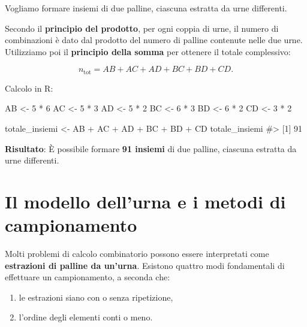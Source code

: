 \documentclass[
  italian,
  letterpaper,
  a4paper,
  11pt,
  open=any]{scrbook}
\newenvironment{Shaded}{\begin{snugshade}}{\end{snugshade}}
\newcommand{\CommentTok}[1]{\textcolor[rgb]{0.37,0.37,0.37}{#1}}
\newcommand{\DecValTok}[1]{\textcolor[rgb]{0.68,0.00,0.00}{#1}}
\newcommand{\NormalTok}[1]{\textcolor[rgb]{0.00,0.23,0.31}{#1}}
\newcommand{\OtherTok}[1]{\textcolor[rgb]{0.00,0.23,0.31}{#1}}
\newcommand{\SpecialCharTok}[1]{\textcolor[rgb]{0.37,0.37,0.37}{#1}}
\providecommand{\tightlist}{%
  \setlength{\itemsep}{0pt}\setlength{\parskip}{0pt}}
\theoremstyle{plain}
\theoremstyle{definition}
\theoremstyle{definition}
\theoremstyle{remark}
\begin{document}
Vogliamo formare insiemi di due palline, ciascuna estratta da urne
differenti.

Secondo il \textbf{principio del prodotto}, per ogni coppia di urne, il
numero di combinazioni è dato dal prodotto del numero di palline
contenute nelle due urne. Utilizziamo poi il \textbf{principio della
somma} per ottenere il totale complessivo:

\[
n_{\text{tot}} = AB + AC + AD + BC + BD + CD.
\]

Calcolo in R:

\begin{Shaded}
\begin{Highlighting}[]
\NormalTok{AB }\OtherTok{\textless{}{-}} \DecValTok{5} \SpecialCharTok{*} \DecValTok{6}
\NormalTok{AC }\OtherTok{\textless{}{-}} \DecValTok{5} \SpecialCharTok{*} \DecValTok{3}
\NormalTok{AD }\OtherTok{\textless{}{-}} \DecValTok{5} \SpecialCharTok{*} \DecValTok{2}
\NormalTok{BC }\OtherTok{\textless{}{-}} \DecValTok{6} \SpecialCharTok{*} \DecValTok{3}
\NormalTok{BD }\OtherTok{\textless{}{-}} \DecValTok{6} \SpecialCharTok{*} \DecValTok{2}
\NormalTok{CD }\OtherTok{\textless{}{-}} \DecValTok{3} \SpecialCharTok{*} \DecValTok{2}

\NormalTok{totale\_insiemi }\OtherTok{\textless{}{-}}\NormalTok{ AB }\SpecialCharTok{+}\NormalTok{ AC }\SpecialCharTok{+}\NormalTok{ AD }\SpecialCharTok{+}\NormalTok{ BC }\SpecialCharTok{+}\NormalTok{ BD }\SpecialCharTok{+}\NormalTok{ CD}
\NormalTok{totale\_insiemi}
\CommentTok{\#\textgreater{} [1] 91}
\end{Highlighting}
\end{Shaded}

\textbf{Risultato}: È possibile formare \textbf{91 insiemi} di due
palline, ciascuna estratta da urne differenti.

\section{Il modello dell'urna e i metodi di
campionamento}\label{il-modello-dellurna-e-i-metodi-di-campionamento}

Molti problemi di calcolo combinatorio possono essere interpretati come
\textbf{estrazioni di palline da un'urna}. Esistono quattro modi
fondamentali di effettuare un campionamento, a seconda che:

\begin{enumerate}
\def\labelenumi{\arabic{enumi}.}
\tightlist
\item
  le estrazioni siano con o senza ripetizione,
\item
  l'ordine degli elementi conti o meno.
\end{enumerate}
\end{document}
